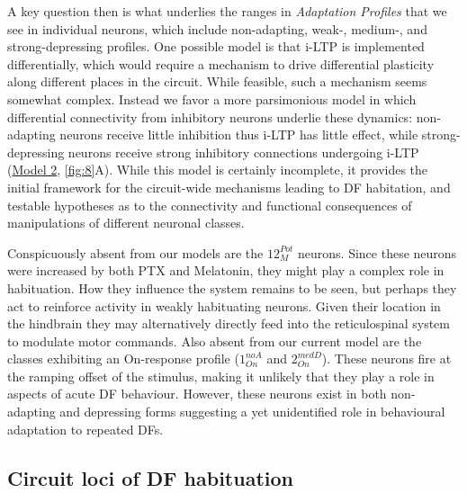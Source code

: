 \documentclass[9pt,lineno]{RandlettLab_elife}
\begin{document}
A key question then is what underlies the ranges in \emph{Adaptation Profiles} that we see in individual neurons, which include non-adapting, weak-, medium-, and strong-depressing profiles. One possible model is that i-LTP is implemented differentially, which would require a mechanism to drive differential plasticity along different places in the circuit. While feasible, such a mechanism seems somewhat complex. Instead we favor a more parsimonious model in which differential connectivity from inhibitory neurons underlie these dynamics: non-adapting neurons receive little inhibition thus i-LTP has little effect, while strong-depressing neurons receive strong inhibitory connections undergoing i-LTP (\underline{Model 2}, \autoref{fig:8}A). While this  model is certainly incomplete, it provides the initial framework for the circuit-wide mechanisms leading to DF habitation, and testable hypotheses as to the connectivity and functional consequences of manipulations of different neuronal classes.

Conspicuously absent from our models are the $12_{M}^{Pot}$ neurons. Since these neurons were increased by both PTX and Melatonin, they might play a complex role in habituation. How they influence the system remains to be seen, but perhaps they act to reinforce activity in weakly habituating neurons. Given their location in the  hindbrain they may alternatively directly feed into the reticulospinal system to modulate motor commands. Also absent from our current model are the classes exhibiting an On-response profile ($1_{On}^{noA}$ and $2_{On}^{medD}$). These neurons fire at the ramping offset of the stimulus, making it unlikely that they play a role in aspects of acute DF behaviour. However, these neurons exist in both non-adapting and depressing forms suggesting a yet unidentified role in behavioural adaptation to repeated DFs. 

\subsection{Circuit loci of DF habituation}
\end{document}
